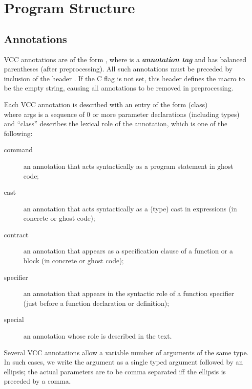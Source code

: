 \documentclass[preprint,nocopyrightspace]{sigplanconf}
\newcommand{\Def}[1]{\textit{\textbf{#1}}}
\begin{document}
\section{Program Structure}

\subsection{Annotations}
VCC annotations are of the form , where  is
a \Def{annotation tag} and  has balanced parentheses (after
preprocessing). All such annotations must be preceded by inclusion of
the header .  If the C flag  is not set,
this header defines the macro \vcc{_()} to be the empty string,
causing all annotations to be removed in preprocessing.

Each VCC annotation is described with an entry of the form
\noindent{} (class)\\
where args is a sequence of 0 or more parameter declarations
(including types) and ``class'' describes the lexical role of the
annotation, which is one of the following:
\begin{description}
\item[command] an annotation that acts syntactically as a program 
statement in ghost code;
\item[cast] an annotation that acts syntactically as a (type) cast in
expressions (in concrete or ghost code);
\item[contract] an annotation that appears as a specification clause
of a function or a block (in concrete or ghost code);
\item[specifier] an annotation that appears in the syntactic role of a
function specifier (just before a function declaration or definition);
\item[special] an annotation whose role is described in the text.
\end{description}
Several VCC annotations allow a variable number of arguments of the
same type. In such cases, we write the argument as a single typed
argument followed by an ellipsis; the actual parameters are to be 
comma separated iff the ellipsis is preceded by a comma.
\end{document}
